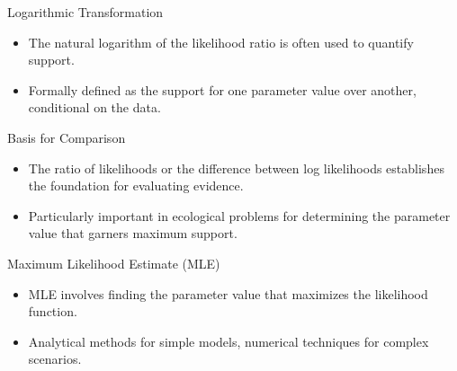 \begin{frame}{Logarithmic Transformation}
  \begin{itemize}
    \item The natural logarithm of the likelihood ratio is often used to quantify support.
    \item Formally defined as the support for one parameter value over another, conditional on the data.
  \end{itemize}
\end{frame}

\begin{frame}{Basis for Comparison}
  \begin{itemize}
    \item The ratio of likelihoods or the difference between log likelihoods establishes the foundation for evaluating evidence.
    \item Particularly important in ecological problems for determining the parameter value that garners maximum support.
  \end{itemize}
\end{frame}

\begin{frame}{Maximum Likelihood Estimate (MLE)}
  \begin{itemize}
    \item MLE involves finding the parameter value that maximizes the likelihood function.
    \item Analytical methods for simple models, numerical techniques for complex scenarios.
  \end{itemize}
\end{frame}


